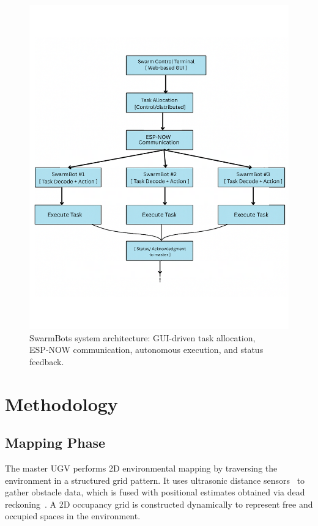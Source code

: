 \documentclass[conference]{IEEEtran}
\begin{document}
\begin{figure}[t]
    \centering
    \includegraphics[width=\columnwidth]{figs/Swarm Block.png}
  \caption{SwarmBots system architecture: GUI-driven task allocation, ESP‑NOW communication, autonomous execution, and status feedback.}
  \label{fig:system-architecture}
\end{figure}

\section{Methodology}
\label{sec:Methodology}

\subsection{Mapping Phase}
The master UGV performs 2D environmental mapping by traversing the environment in a structured grid pattern. It uses ultrasonic distance sensors~\cite{arduino_hcsr04} to gather obstacle data, which is fused with positional estimates obtained via dead reckoning~\cite{kalra2005hoplite}. A 2D occupancy grid is constructed dynamically to represent free and occupied spaces in the environment.
\end{document}
